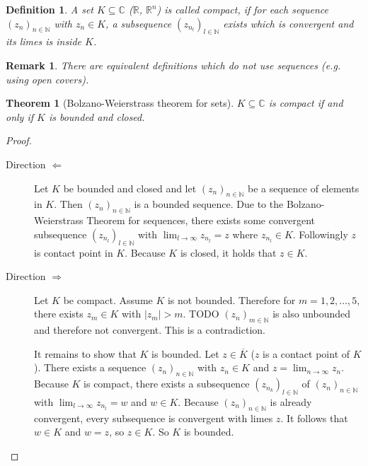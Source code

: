 \documentclass[a4paper,landscape,twocolumn]{article}
\newtheorem{theorem}{Theorem}
\newtheorem{defi}{Definition}
\newtheorem{rem}{Remark}
\newcommand\abs[1]{\left|#1\right|}
\newcommand\seq[1]{{\left(#1\right)}_{n \in \mathbb N}}
\begin{document}
\begin{defi}
  A set $K \subseteq \mathbb C$ ($\mathbb R$, $\mathbb R^n$) is called \emph{compact},
  if for each sequence $\seq{z_n}$ with $z_n \in K$,
  a subsequence $\left(z_{n_l}\right)_{l \in \mathbb N}$
  exists which is convergent and its limes is inside $K$.
\end{defi}
%
\begin{rem}
  There are equivalent definitions which do not use sequences (e.g. using open covers).
\end{rem}
%
\begin{theorem}[Bolzano-Weierstrass theorem for sets]
  $K \subseteq \mathbb C$ is compact if and only if $K$ is bounded and closed.
\end{theorem}
\begin{proof}
  \begin{description}
    \item[Direction $\Leftarrow$]
      Let $K$ be bounded and closed and let $\seq{z_n}$ be a sequence of elements
      in $K$. Then $\seq{z_n}$ is a bounded sequence. Due to the Bolzano-Weierstrass
      Theorem for sequences, there exists some convergent subsequence
      $\left(z_{n_l}\right)_{l \in \mathbb N}$ with $\lim_{l\to\infty} z_{n_l} = z$
      where $z_{n_l} \in K$. Followingly $z$ is contact point in $K$.
      Because $K$ is closed, it holds that $z \in K$.
    \item[Direction $\Rightarrow$]
      Let $K$ be compact. Assume $K$ is not bounded.
      Therefore for $m = 1, 2, \dots, 5$, there exists $z_m \in K$ with $\abs{z_m} > m$.
      TODO
      $\left(z_n\right)_{m\in\mathbb N}$ is also unbounded and therefore not convergent.
      This is a contradiction.

      It remains to show that $K$ is bounded. Let $z \in \overline{K}$ ($z$ is a contact point of $K$).
      There exists a sequence $\seq{z_n}$ with $z_n \in K$ and $z = \lim_{n\to\infty} z_n$.
      Because $K$ is compact, there exists a subsequence $\left(z_{n_k}\right)_{l\in\mathbb N}$ of
      $\seq{z_n}$ with $\lim_{l\to\infty} z_{n_l} = w$ and $w \in K$.
      Because $\seq{z_n}$ is already convergent, every subsequence is convergent
      with limes $z$.
      It follows that $w \in K$ and $w = z$, so $z \in K$. So $K$ is bounded.
  \end{description}
\end{proof}
\end{document}
